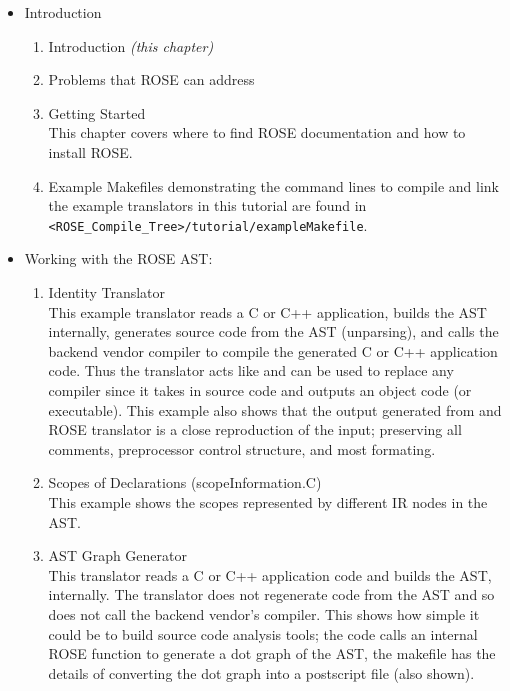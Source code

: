 \begin{itemize}
\item Introduction 

\begin{enumerate}
     \item Introduction {\em (this chapter)}
     \item Problems that ROSE can address
     \item Getting Started \\
           This chapter covers where to find ROSE documentation and how to install ROSE.

     \item Example Makefiles demonstrating the command lines to compile and link the 
           example translators in this tutorial are found in 
           {\tt <ROSE\_Compile\_Tree>/tutorial/exampleMakefile}.

\end{enumerate}

\item Working with the ROSE AST:
\begin{enumerate}
     \item Identity Translator \\
           This example translator reads a C or C++ application, builds the AST
           internally, generates source code from the AST (unparsing), and calls
           the backend vendor compiler to compile the generated C or C++ application 
           code.  Thus the translator acts like and can be used to replace any compiler 
           since it takes in source code and outputs an object code (or executable).
           This example also shows that the output generated from and ROSE translator is
           a close reproduction of the input; preserving all comments, preprocessor
           control structure, and most formating.

     \item Scopes of Declarations (scopeInformation.C) \\
           This example shows the scopes represented by different IR nodes in the AST.


     \item AST Graph Generator \\
           This translator reads a C or C++ application code and builds the AST, internally.
           The translator does not regenerate code from the AST and so does not
           call the backend vendor's compiler. This shows how simple it could be
           to build source code analysis tools; the code calls an internal ROSE function
           to generate a dot graph of the AST, the makefile has the details of converting
           the dot graph into a postscript file (also shown).


\end{enumerate}
\end{itemize}
